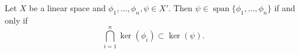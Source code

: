 Let $X$ be a linear space and $\phi_1, \ldots, \phi_n, \psi \in X'$. Then $\psi \in \operatorname{span}\{\phi_1, \ldots, \phi_n\}$ if and only if $$\bigcap_{i=1}^{n} \ker(\phi_i) \subset \ker(\psi).$$
